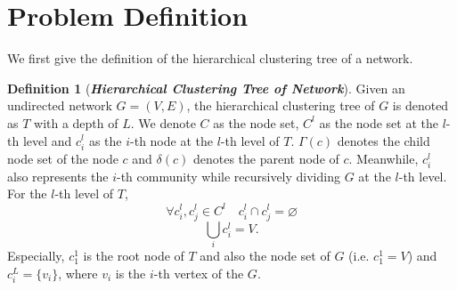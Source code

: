 \documentclass{article}
\theoremstyle{definition}
\newtheorem{defn}{Definition}
\begin{document}
	\section{Problem Definition}
		We first give the definition of the hierarchical clustering tree \cite{clauset2008hierarchical} of a network.
		\begin{defn}[\textbf{\emph{Hierarchical Clustering Tree of Network}}]
			Given an undirected network $G = (V, E)$, the hierarchical clustering tree of $G$ is denoted as $T$ with a depth of $L$. We denote $C$ as the node set,
			$C^l$ as the node set at the $l$-th level and $c^l_i$ as the $i$-th node at the $l$-th level of $T$. $\Gamma(c)$ denotes the child node set of the node $c$ and $\delta(c)$ denotes the parent node of $c$. Meanwhile, $c^l_i$ also represents the $i$-th community while recursively dividing $G$ at the $l$-th level. For the $l$-th level of $T$,
				\[
				\forall c^l_i, c^l_j \in C^l \quad c^l_i \cap c^l_j = \varnothing
				\]
				\[
				\bigcup_i c_i^l = V.
				\]
			Especially, $c_1^1$ is the root node of $T$ and also the node set of $G$ (i.e. $c_1^1 = V$) and $c_i^L = \{v_i\}$, where $v_i$ is the $i$-th vertex of the $G$.
		\end{defn}
		
\end{document}
